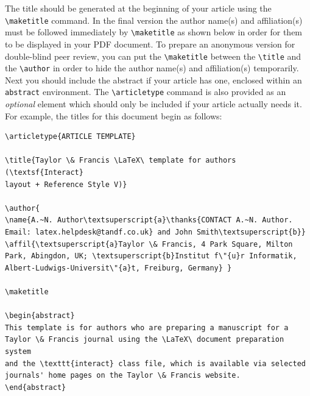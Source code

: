 \documentclass[]{interact}
\theoremstyle{plain}%
\theoremstyle{definition}
\theoremstyle{remark}
\begin{document}
The title should be generated at the beginning of your article using the \verb"\maketitle" command.
In the final version the author name(s) and affiliation(s) must be followed immediately by \verb"\maketitle" as shown below in order for them to be displayed in your PDF document.
To prepare an anonymous version for double-blind peer review, you can put the \verb"\maketitle" between the \verb"\title" and the \verb"\author" in order to hide the author name(s) and affiliation(s) temporarily.
Next you should include the abstract if your article has one, enclosed within an \texttt{abstract} environment.
The \verb"\articletype" command is also provided as an \emph{optional} element which should only be included if your article actually needs it.
For example, the titles for this document begin as follows:
\begin{verbatim}
\articletype{ARTICLE TEMPLATE}

\title{Taylor \& Francis \LaTeX\ template for authors (\textsf{Interact}
layout + Reference Style V)}

\author{
\name{A.~N. Author\textsuperscript{a}\thanks{CONTACT A.~N. Author.
Email: latex.helpdesk@tandf.co.uk} and John Smith\textsuperscript{b}}
\affil{\textsuperscript{a}Taylor \& Francis, 4 Park Square, Milton
Park, Abingdon, UK; \textsuperscript{b}Institut f\"{u}r Informatik,
Albert-Ludwigs-Universit\"{a}t, Freiburg, Germany} }

\maketitle

\begin{abstract}
This template is for authors who are preparing a manuscript for a
Taylor \& Francis journal using the \LaTeX\ document preparation system
and the \texttt{interact} class file, which is available via selected
journals' home pages on the Taylor \& Francis website.
\end{abstract}
\end{verbatim}
\end{document}
